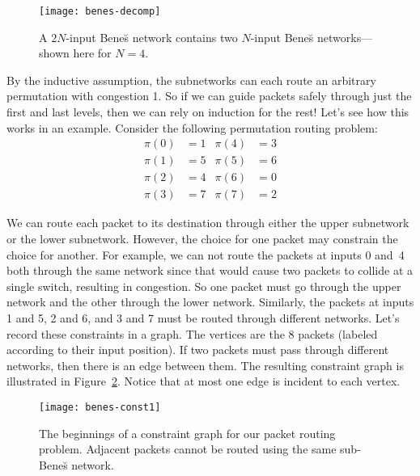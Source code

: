 \begin{figure}

\texttt{[image: benes-decomp]}

\caption{A $2N$-input Bene\u{s} network contains two $N$-input
  Bene\u{s} networks---shown here for $N = 4$.}

\label{fig:6EU}

\end{figure}

By the inductive assumption, the subnetworks can each route an
arbitrary permutation with congestion 1.  So if we can guide packets
safely through just the first and last levels, then we can rely on
induction for the rest!  Let's see how this works in an example.
Consider the following permutation routing problem:
%
\begin{align*}
\pi(0) & = 1 & \pi(4) & = 3 \\
\pi(1) & = 5 & \pi(5) & = 6 \\
\pi(2) & = 4 & \pi(6) & = 0 \\
\pi(3) & = 7 & \pi(7) & = 2
\end{align*}

We can route each packet to its destination through either the upper
subnetwork or the lower subnetwork.  However, the choice for one
packet may constrain the choice for another.  For example, we can not
route the packets at inputs 0 and~4 both through the same network
since that would cause two packets to collide at a single switch,
resulting in congestion.  So one packet must go through the upper
network and the other through the lower network.  Similarly, the
packets at inputs 1 and 5, 2 and 6, and 3 and 7 must be routed through
different networks.  Let's record these constraints in a graph.  The
vertices are the 8 packets (labeled according to their input
position).  If two packets must pass through different networks, then
there is an edge between them.  The resulting constraint graph is
illustrated in Figure~\ref{fig:6EV}.  Notice that at most one edge is
incident to each vertex.

\begin{figure}


\texttt{[image: benes-const1]}

\caption{The beginnings of a constraint graph for our packet routing
  problem.  Adjacent packets cannot be routed using the same
  sub-Bene\u{s} network.}

\label{fig:6EV}

\end{figure}

